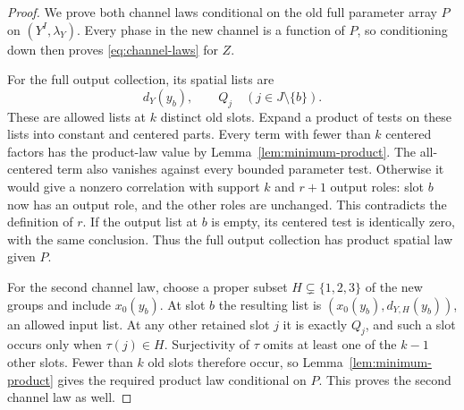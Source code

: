 \begin{proof}
We prove both channel laws conditional on the old full parameter
array $P$ on $(Y^I,\lambda_Y)$. Every phase in the new channel is a
function of $P$, so conditioning down then proves
\eqref{eq:channel-laws} for $Z$.

For the full output collection, its spatial lists are
\[
  d_Y(y_b),\qquad Q_j\quad(j\in J\setminus\{b\}).
\]
These are allowed lists at $k$ distinct old slots. Expand a product
of tests on these lists into constant and centered parts. Every term
with fewer than $k$ centered factors has the product-law value by
Lemma~\ref{lem:minimum-product}. The all-centered term also vanishes
against every bounded parameter test. Otherwise it would give a
nonzero correlation with support $k$ and $r+1$ output roles: slot $b$
now has an output role, and the other roles are unchanged. This
contradicts the definition of $r$. If the output list at $b$ is empty,
its centered test is identically zero, with the same conclusion.
Thus the full output collection has product spatial law given $P$.

For the second channel law, choose a proper subset
$H\subsetneq\{1,2,3\}$ of the new groups and include $x_0(y_b)$.
At slot $b$ the resulting list is
$(x_0(y_b),d_{Y,H}(y_b))$, an allowed input list. At any other retained
slot $j$ it is exactly $Q_j$, and such a slot occurs only when
$\tau(j)\in H$. Surjectivity of $\tau$ omits at least one of the
$k-1$ other slots. Fewer than $k$ old slots therefore occur, so
Lemma~\ref{lem:minimum-product} gives the required product law
conditional on $P$. This proves the second channel law as well.
\end{proof}
